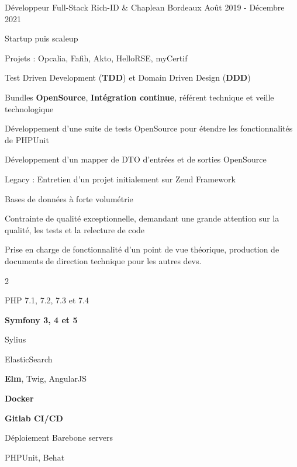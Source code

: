 \begin{cventries}
	\begin{cvexperience}
		\cvbigentry
		{Développeur Full-Stack} %
		{ Rich-ID \& Chaplean} %
		{Bordeaux} %
		{Août 2019 - Décembre 2021} %
		{
			\vspace{2mm}
			\begin{cvitems} %
				\item {Startup puis scaleup}
				\item {Projets : Opcalia, Fafih, Akto, HelloRSE, myCertif}
				\item {Test Driven Development (\textbf{TDD}) et Domain Driven Design (\textbf{DDD})}
				\item {Bundles \textbf{OpenSource}, \textbf{Intégration continue}, référent technique et veille technologique}
				\item {Développement d'une suite de tests OpenSource pour étendre les fonctionnalités de PHPUnit}
				\item {Développement d'un mapper de DTO d'entrées et de sorties OpenSource}
				\item {Legacy : Entretien d'un projet initialement sur Zend Framework}
				\item {Bases de données à forte volumétrie}
				\item {Contrainte de qualité exceptionnelle, demandant une grande attention sur la qualité, les tests et la relecture de code}
				\item {Prise en charge de fonctionnalité d'un point de vue théorique, production de documents de direction technique pour les autres devs.}
			\end{cvitems}
		}

		\vspace{-5mm}
		\begin{multicols}{2}
			\begin{cvitems}
				\item PHP 7.1, 7.2, 7.3 et 7.4
				\item \textbf{Symfony 3, 4 et 5}
				\item Sylius
				\item ElasticSearch
				\item \textbf{Elm}, Twig, AngularJS
				\item \textbf{Docker}
				\item \textbf{Gitlab CI/CD}
				\item Déploiement Barebone servers
				\item PHPUnit, Behat
			\end{cvitems}
		\end{multicols}
	\end{cvexperience}

\end{cventries}
